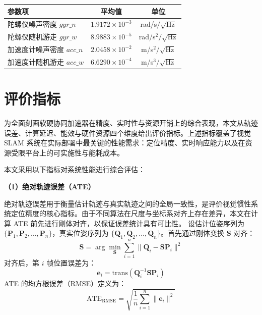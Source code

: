 \begin{table}[htbp]
\centering
{}
\label{tab:xczu19eg_imu_calib}
\scriptsize
\begin{tabular}{lcc}
\toprule
参数项 & 平均值 & 单位 \\
\midrule
陀螺仪噪声密度 $gyr\_n$ & $1.9172 \times 10^{-3}$ & rad/s$/\sqrt{\mathrm{Hz}}$ \\
陀螺仪随机游走 $gyr\_w$ & $8.9883 \times 10^{-5}$ & rad/s$^2/\sqrt{\mathrm{Hz}}$ \\
加速度计噪声密度 $acc\_n$ & $2.0458 \times 10^{-2}$ & m/s$^2/\sqrt{\mathrm{Hz}}$ \\
加速度计随机游走 $acc\_w$ & $6.6290 \times 10^{-4}$ & m/s$^3/\sqrt{\mathrm{Hz}}$ \\
\bottomrule
\end{tabular}
\end{table}

\section{评价指标}

为全面刻画软硬协同加速器在精度、实时性与资源开销上的综合表现，本文从轨迹误差、计算延迟、能效与硬件资源四个维度给出评价指标。上述指标覆盖了视觉 SLAM 系统在实际部署中最关键的性能需求：定位精度、实时响应能力以及在资源受限平台上的可实施性与能耗成本。

本文采用以下指标对系统性能进行综合评估：

\textbf{（1）绝对轨迹误差（ATE）}

绝对轨迹误差用于衡量估计轨迹与真实轨迹之间的全局一致性，是评价视觉惯性系统定位精度的核心指标。由于不同算法在尺度与坐标系对齐上存在差异，本文在计算 ATE 前先进行刚体对齐，以保证误差统计具有可比性。
设估计位姿序列为 $\{\mathbf{P}_1, \mathbf{P}_2, \ldots, \mathbf{P}_n\}$，真实位姿序列为 $\{\mathbf{Q}_1, \mathbf{Q}_2, \ldots, \mathbf{Q}_n\}$。首先通过刚体变换 $\mathbf{S}$ 对齐：
\begin{equation}
\mathbf{S} = \arg\min_{\mathbf{S}} \sum_{i=1}^{n} \| \mathbf{Q}_i - \mathbf{S} \mathbf{P}_i \|^2
\label{eq:ate_alignment}
\end{equation}
对齐后，第 $i$ 帧位置误差为：
\begin{equation}
\mathbf{e}_i = \mathrm{trans}(\mathbf{Q}_i^{-1} \mathbf{S} \mathbf{P}_i)
\label{eq:ate_error}
\end{equation}
ATE 的均方根误差（RMSE）定义为：
\begin{equation}
\text{ATE}_{\text{RMSE}} = \sqrt{\frac{1}{n} \sum_{i=1}^{n} \| \mathbf{e}_i \|^2}
\label{eq:ate_rmse}
\end{equation}

